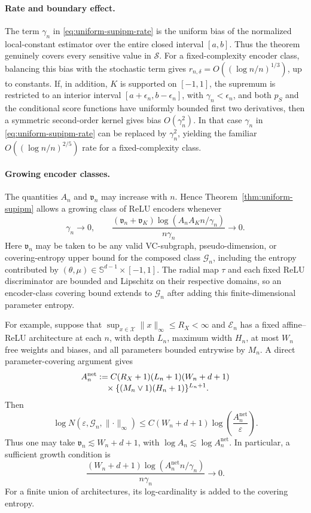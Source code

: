 \documentclass[10pt]{article}
\begin{document}
\paragraph{Rate and boundary effect.}
The term \(\gamma_n\) in \eqref{eq:uniform-supipm-rate} is the uniform bias
of the normalized local-constant estimator over the entire closed interval
\([a,b]\).  Thus the theorem genuinely covers every sensitive value in
\(\mathcal S\).  For a fixed-complexity encoder class, balancing this bias
with the stochastic term gives
  \(r_{n,\delta}=O((\log n/n)^{1/3})\), up to constants.  If, in
addition, \(K\) is supported on \([-1,1]\), the supremum is restricted
to an interior interval
\([a+\epsilon_n,b-\epsilon_n]\), with
\(\gamma_n<\epsilon_n\), and both \(p_S\) and the conditional score
functions have uniformly bounded first two derivatives, then a symmetric
second-order kernel gives
bias \(O(\gamma_n^2)\).  In that case \(\gamma_n\) in
\eqref{eq:uniform-supipm-rate} can be replaced by \(\gamma_n^2\), yielding
the familiar \(O((\log n/n)^{2/5})\) rate for a fixed-complexity
class.

\paragraph{Growing encoder classes.}
The quantities \(A_n\) and \(\mathfrak v_n\) may increase with \(n\).  Hence
Theorem~\ref{thm:uniform-supipm} allows a growing class of ReLU encoders
whenever
\[
  \gamma_n\to0,
  \qquad
  \frac{(\mathfrak v_n+\mathfrak v_K)
  \log(A_nA_Kn/\gamma_n)}{n\gamma_n}\to0.
\]
Here \(\mathfrak v_n\) may be taken to be any valid VC-subgraph,
pseudo-dimension, or covering-entropy upper bound for the composed class
\(\mathcal G_n\), including the entropy contributed by
\((\theta,\mu)\in\mathbb S^{d-1}\times[-1,1]\).  The radial map \(\tau\)
and each fixed ReLU discriminator are bounded and Lipschitz on their
respective domains, so an encoder-class covering bound extends to
\(\mathcal G_n\) after adding this finite-dimensional parameter entropy.

For example, suppose that
\(\sup_{x\in\mathcal X}\lVert x\rVert_\infty\le R_X<\infty\) and
\(\mathcal E_n\) has a fixed affine--ReLU architecture at each \(n\), with
depth \(L_n\), maximum width \(H_n\), at most \(W_n\) free weights and
biases, and all parameters bounded entrywise by \(M_n\).  A direct
parameter-covering argument gives
\begin{align}
  A_n^{\mathrm{net}}
  &:=C(R_X+1)(L_n+1)(W_n+d+1)\notag\\[-1mm]
  &\quad\times
  \{(M_n\vee1)(H_n+1)\}^{L_n+1}.
  \label{eq:network-entropy-constant}
\end{align}
Then
\begin{equation*}
  \log N(\varepsilon,\mathcal G_n,\lVert\cdot\rVert_\infty)
  \le C(W_n+d+1)
  \log\!\left(\frac{A_n^{\mathrm{net}}}{\varepsilon}\right).
\end{equation*}
Thus one may take \(\mathfrak v_n\lesssim W_n+d+1\), with
\(\log A_n\lesssim\log A_n^{\mathrm{net}}\).  In particular, a sufficient
growth condition is
\[
  \frac{(W_n+d+1)
        \log(A_n^{\mathrm{net}}n/\gamma_n)}{n\gamma_n}
  \to0.
\]
For a finite union of architectures, its log-cardinality is added to the
covering entropy.
\end{document}
